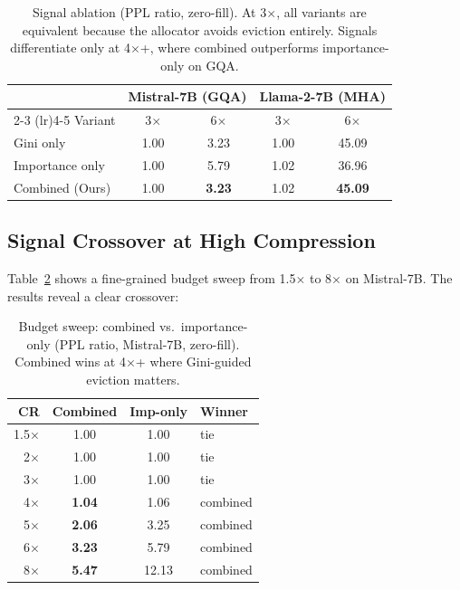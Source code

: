 \documentclass{article}
\begin{document}
\begin{table}[t]
\centering
\caption{Signal ablation (PPL ratio, zero-fill). At 3$\times$, all variants are equivalent because the allocator avoids eviction entirely. Signals differentiate only at 4$\times$+, where combined outperforms importance-only on GQA.}
\label{tab:ablation_signals}
\small
\setlength{\tabcolsep}{3pt}
\begin{tabular}{@{}lcccc@{}}
\toprule
& \multicolumn{2}{c}{Mistral-7B (GQA)} & \multicolumn{2}{c}{Llama-2-7B (MHA)} \\
\cmidrule(lr){2-3} \cmidrule(lr){4-5}
Variant & 3$\times$ & 6$\times$ & 3$\times$ & 6$\times$ \\
\midrule
Gini only          & 1.00 & 3.23 & 1.00 & 45.09 \\
Importance only    & 1.00 & 5.79 & 1.02 & 36.96 \\
Combined (Ours)    & 1.00 & \textbf{3.23} & 1.02 & \textbf{45.09} \\
\bottomrule
\end{tabular}
\vspace{-0.05in}
\end{table}

\subsection{Signal Crossover at High Compression}

Table~\ref{tab:ablation_sweep} shows a fine-grained budget sweep from 1.5$\times$ to 8$\times$ on Mistral-7B.
The results reveal a clear crossover:

\begin{table}[t]
\centering
\caption{Budget sweep: combined vs.\ importance-only (PPL ratio, Mistral-7B, zero-fill). Combined wins at 4$\times$+ where Gini-guided eviction matters.}
\label{tab:ablation_sweep}
\small
\begin{tabular}{@{}rccl@{}}
\toprule
CR & Combined & Imp-only & Winner \\
\midrule
1.5$\times$ & 1.00 & 1.00 & tie \\
2$\times$   & 1.00 & 1.00 & tie \\
3$\times$   & 1.00 & 1.00 & tie \\
4$\times$   & \textbf{1.04} & 1.06 & combined \\
5$\times$   & \textbf{2.06} & 3.25 & combined \\
6$\times$   & \textbf{3.23} & 5.79 & combined \\
8$\times$   & \textbf{5.47} & 12.13 & combined \\
\bottomrule
\end{tabular}
\vspace{-0.05in}
\end{table}
\end{document}
